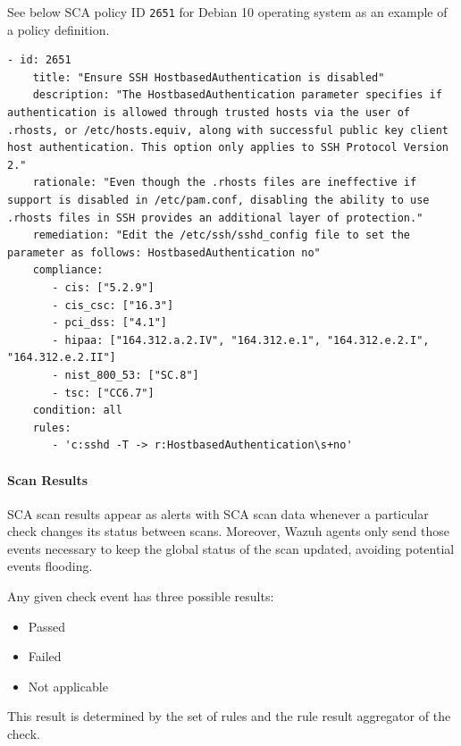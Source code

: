 See below SCA policy ID \texttt{2651} for Debian 10 operating system as an example of a policy definition.
\begin{verbatim}
- id: 2651
    title: "Ensure SSH HostbasedAuthentication is disabled"
    description: "The HostbasedAuthentication parameter specifies if authentication is allowed through trusted hosts via the user of .rhosts, or /etc/hosts.equiv, along with successful public key client host authentication. This option only applies to SSH Protocol Version 2."
    rationale: "Even though the .rhosts files are ineffective if support is disabled in /etc/pam.conf, disabling the ability to use .rhosts files in SSH provides an additional layer of protection."
    remediation: "Edit the /etc/ssh/sshd_config file to set the parameter as follows: HostbasedAuthentication no"
    compliance:
       - cis: ["5.2.9"]
       - cis_csc: ["16.3"]
       - pci_dss: ["4.1"]
       - hipaa: ["164.312.a.2.IV", "164.312.e.1", "164.312.e.2.I", "164.312.e.2.II"]
       - nist_800_53: ["SC.8"]
       - tsc: ["CC6.7"]
    condition: all
    rules:
       - 'c:sshd -T -> r:HostbasedAuthentication\s+no'
\end{verbatim}
\paragraph{Scan Results}
SCA scan results appear as alerts with SCA scan data whenever a particular check changes its status between scans. Moreover, Wazuh agents only send those events necessary to keep the global status of the scan updated, avoiding potential events flooding.

Any given check event has three possible results:
\begin{itemize}
    \item Passed
    \item Failed
    \item Not applicable
\end{itemize}

This result is determined by the set of rules and the rule result aggregator of the check.

